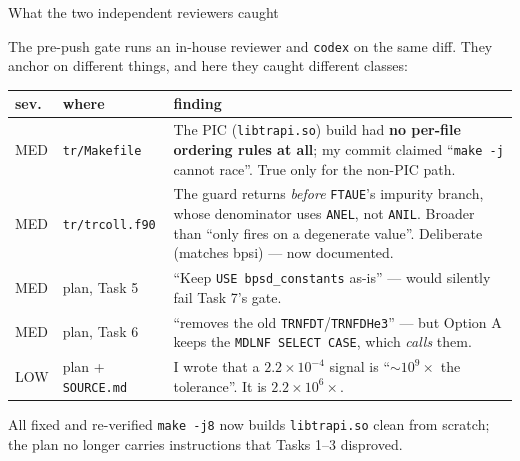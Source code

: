 \documentclass[10pt,aspectratio=169]{beamer}
\newcommand{\C}[1]{\texttt{\small #1}}          %
\begin{document}
\begin{frame}{What the two independent reviewers caught}

The pre-push gate runs an in-house reviewer and \C{codex} on the same diff. They anchor on different things,
and here they caught different classes:

\vspace{0.4em}
\begin{center}
\small
\begin{tabular}{@{}llp{}@{}}
\toprule
sev. & where & finding \\
\midrule
MED & \C{tr/Makefile} & The PIC (\C{libtrapi.so}) build had \textbf{no per-file ordering rules at all}; my
      commit claimed ``\C{make -j} cannot race''. True only for the non-PIC path. \\[0.3em]
MED & \C{tr/trcoll.f90} & The guard returns \emph{before} \C{FTAUE}'s impurity branch, whose denominator uses
      \C{ANEL}, not \C{ANIL}. Broader than ``only fires on a degenerate value''. Deliberate (matches bpsi) --- now
      documented. \\[0.3em]
MED & plan, Task 5 & ``Keep \C{USE bpsd\_constants} as-is'' --- would silently fail Task 7's gate. \\[0.3em]
MED & plan, Task 6 & ``removes the old \C{TRNFDT}/\C{TRNFDHe3}'' --- but Option A keeps the \C{MDLNF SELECT CASE},
      which \emph{calls} them. \\[0.3em]
LOW & plan + \C{SOURCE.md} & I wrote that a $2.2\times10^{-4}$ signal is ``$\sim10^{9}\times$ the tolerance''.
      It is $2.2\times10^{6}\times$. \\
\bottomrule
\end{tabular}
\end{center}

\vspace{0.3em}
\begin{block}{All fixed and re-verified}
\C{make -j8} now builds \C{libtrapi.so} clean from scratch; the plan no longer carries instructions that
Tasks 1--3 disproved.
\end{block}
\end{frame}
\end{document}
